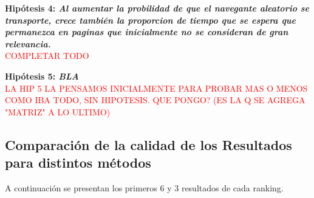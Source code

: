 \documentclass[a4paper]{article}
\begin{document}
\newpage


\textbf{Hipótesis 4: \itshape{Al aumentar la probilidad de que el navegante aleatorio se transporte, crece también la proporcion de tiempo que se espera que permanezca en paginas que inicialmente no se consideran de gran relevancia.
 }}\\
\textcolor{red}{COMPLETAR TODO}\\

\newpage

\textbf{Hipótesis 5: \itshape{BLA }}\\
\textcolor{red}{LA HIP 5 LA PENSAMOS INICIALMENTE PARA PROBAR MAS O MENOS COMO IBA TODO, SIN HIPOTESIS. QUE PONGO? (ES LA Q SE AGREGA "MATRIZ" A LO ULTIMO)}\\

\newpage
\subsection{Comparaci\'on de la calidad de los Resultados para distintos m\'etodos}
A continuaci\'on se presentan los primeros 6 y 3 resultados de cada ranking.
\end{document}
